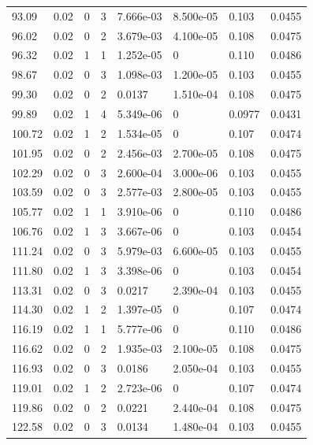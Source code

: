 \documentclass[preview]{standalone}
\begin{document}
{{{\begin{tabular}{L{1.2cm}C{1.2cm} C{0.3cm}C{0.5cm} C{1.4cm}C{1.4cm} C{1.4cm}C{1.4cm}}
  93.09  &  0.02  & 0     &  3 &  7.666e-03  & 8.500e-05  & 0.103 &  0.0455   \\ 
  96.02  &  0.02  & 0     &  2 &  3.679e-03  & 4.100e-05  & 0.108 &  0.0475   \\ 
  96.32  &  0.02  & 1     &  1 &  1.252e-05  & 0  & 0.110 &  0.0486   \\ 
  98.67  &  0.02  & 0     &  3 &  1.098e-03  & 1.200e-05  & 0.103 &  0.0455   \\ 
  99.30  &  0.02  & 0     &  2 &  0.0137  & 1.510e-04  & 0.108 &  0.0475   \\ 
  99.89  &  0.02  & 1     &  4 &  5.349e-06  & 0  & 0.0977 &  0.0431   \\ 
  100.72  &  0.02  & 1     &  2 &  1.534e-05  & 0  & 0.107 &  0.0474   \\ 
  101.95  &  0.02  & 0     &  2 &  2.456e-03  & 2.700e-05  & 0.108 &  0.0475   \\ 
  102.29  &  0.02  & 0     &  3 &  2.600e-04  & 3.000e-06  & 0.103 &  0.0455   \\ 
  103.59  &  0.02  & 0     &  3 &  2.577e-03  & 2.800e-05  & 0.103 &  0.0455   \\ 
  105.77  &  0.02  & 1     &  1 &  3.910e-06  & 0  & 0.110 &  0.0486   \\ 
  106.76  &  0.02  & 1     &  3 &  3.667e-06  & 0  & 0.103 &  0.0454   \\ 
  111.24  &  0.02  & 0     &  3 &  5.979e-03  & 6.600e-05  & 0.103 &  0.0455   \\ 
  111.80  &  0.02  & 1     &  3 &  3.398e-06  & 0  & 0.103 &  0.0454   \\ 
  113.31  &  0.02  & 0     &  3 &  0.0217  & 2.390e-04  & 0.103 &  0.0455   \\ 
  114.30  &  0.02  & 1     &  2 &  1.397e-05  & 0  & 0.107 &  0.0474   \\ 
  116.19  &  0.02  & 1     &  1 &  5.777e-06  & 0  & 0.110 &  0.0486   \\ 
  116.62  &  0.02  & 0     &  2 &  1.935e-03  & 2.100e-05  & 0.108 &  0.0475   \\ 
  116.93  &  0.02  & 0     &  3 &  0.0186  & 2.050e-04  & 0.103 &  0.0455   \\ 
  119.01  &  0.02  & 1     &  2 &  2.723e-06  & 0  & 0.107 &  0.0474   \\ 
  119.86  &  0.02  & 0     &  2 &  0.0221  & 2.440e-04  & 0.108 &  0.0475   \\ 
  122.58  &  0.02  & 0     &  3 &  0.0134  & 1.480e-04  & 0.103 &  0.0455   \\ 

\end{tabular}}}}
\end{document}
